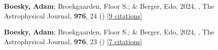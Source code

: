 \item[{\color{numcolor}\scriptsize2}] \textbf{Boesky, Adam}; Broekgaarden, Floor S.; \& Berger, Edo, 2024, , The Astrophysical Journal, \textbf{976}, 24 () [\href{https://ui.adsabs.harvard.edu/abs/2024ApJ...976...24B}{9 citations}]

\item[{\color{numcolor}\scriptsize1}] \textbf{Boesky, Adam}; Broekgaarden, Floor S.; \& Berger, Edo, 2024, , The Astrophysical Journal, \textbf{976}, 23 () [\href{https://ui.adsabs.harvard.edu/abs/2024ApJ...976...23B}{7 citations}]